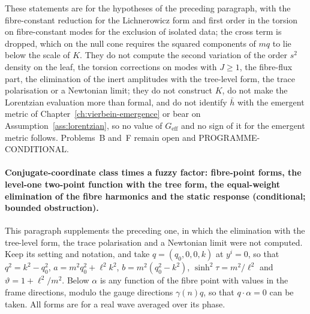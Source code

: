 These statements are for the hypotheses of the preceding paragraph, with the fibre-constant reduction for the Lichnerowicz form and first order in the torsion on fibre-constant modes for the exclusion of isolated data; the cross term is dropped, which on the null cone requires the squared components of \(mq\) to lie below the scale of \(K\). They do not compute the second variation of the order \(s^2\) density on the leaf, the torsion corrections on modes with \(J\ge1\), the fibre-flux part, the elimination of the inert amplitudes with the tree-level form, the trace polarisation or a Newtonian limit; they do not construct \(K\), do not make the Lorentzian evaluation more than formal, and do not identify \(\bar h\) with the emergent metric of Chapter~\ref{ch:vierbein-emergence} or bear on Assumption~\ref{ass:lorentzian}, so no value of \(G_{\mathrm{eff}}\) and no sign of it for the emergent metric follows. Problems~B and~F remain open and PROGRAMME-CONDITIONAL.

\paragraph{Conjugate-coordinate class times a fuzzy factor: fibre-point forms, the level-one two-point function with the tree form, the equal-weight elimination of the fibre harmonics and the static response (conditional; bounded obstruction).}
This paragraph supplements the preceding one, in which the elimination with the tree-level form, the trace polarisation and a Newtonian limit were not computed. Keep its setting and notation, and take \(q=(q_0,0,0,k)\) at \(y^i=0\), so that \(q^2=k^2-q_0^2\), \(a=m^2q_0^2+\ell^2k^2\), \(b=m^2(q_0^2-k^2)\), \(\sinh^2\tau=m^2/\ell^2\) and \(\vartheta=1+\ell^2/m^2\). Below \(\alpha\) is any function of the fibre point with values in the frame directions, modulo the gauge directions \(\gamma(n)q\), so that \(q\cdot\alpha=0\) can be taken. All forms are for a real wave averaged over its phase.

